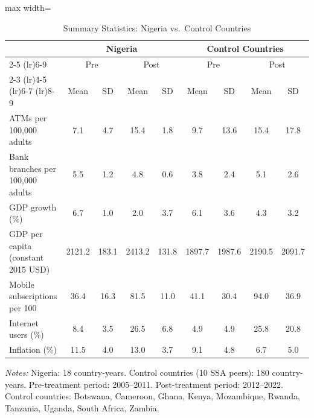 \begin{table}[H]
\centering
\caption{Summary Statistics: Nigeria vs.\ Control Countries}
\label{tab:summary}
\begin{threeparttable}
\begin{adjustbox}{max width=\textwidth}
\scriptsize
\begin{tabular}{l cc cc cc cc}
\toprule
 & \multicolumn{4}{c}{Nigeria} & \multicolumn{4}{c}{Control Countries} \\
\cmidrule(lr){2-5} \cmidrule(lr){6-9}
 & \multicolumn{2}{c}{Pre} & \multicolumn{2}{c}{Post} & \multicolumn{2}{c}{Pre} & \multicolumn{2}{c}{Post} \\
\cmidrule(lr){2-3} \cmidrule(lr){4-5} \cmidrule(lr){6-7} \cmidrule(lr){8-9}
 & Mean & SD & Mean & SD & Mean & SD & Mean & SD \\
\midrule
ATMs per 100,000 adults & 7.1 & 4.7 & 15.4 & 1.8 & 9.7 & 13.6 & 15.4 & 17.8 \\
Bank branches per 100,000 adults & 5.5 & 1.2 & 4.8 & 0.6 & 3.8 & 2.4 & 5.1 & 2.6 \\
GDP growth (\%) & 6.7 & 1.0 & 2.0 & 3.7 & 6.1 & 3.6 & 4.3 & 3.2 \\
GDP per capita (constant 2015 USD) & 2121.2 & 183.1 & 2413.2 & 131.8 & 1897.7 & 1987.6 & 2190.5 & 2091.7 \\
Mobile subscriptions per 100 & 36.4 & 16.3 & 81.5 & 11.0 & 41.1 & 30.4 & 94.0 & 36.9 \\
Internet users (\%) & 8.4 & 3.5 & 26.5 & 6.8 & 4.9 & 4.9 & 25.8 & 20.8 \\
Inflation (\%) & 11.5 & 4.0 & 13.0 & 3.7 & 9.1 & 4.8 & 6.7 & 5.0 \\
\bottomrule
\end{tabular}
\end{adjustbox}
\begin{tablenotes}[flushleft]
\footnotesize\raggedright
\scriptsize
\item \textit{Notes:} Nigeria: 18 country-years. Control countries (10 SSA peers): 180 country-years.
Pre-treatment period: 2005--2011. Post-treatment period: 2012--2022.
Control countries: Botswana, Cameroon, Ghana, Kenya, Mozambique, Rwanda, Tanzania, Uganda, South Africa, Zambia.
\end{tablenotes}
\end{threeparttable}
\end{table}
